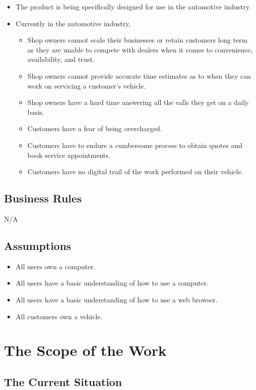 \documentclass[12pt]{article}
\begin{document}
\begin{itemize}
    \item The product is being specifically designed for use in the automotive industry.
    \item Currently in the automotive industry, 
    \begin{itemize}
        \item Shop owners cannot scale their businesses or retain customers long term as they are unable to compete with dealers when it comes to convenience, availability, and trust.
        \item Shop owners cannot provide accurate time estimates as to when they can work on servicing a customer's vehicle.
        \item Shop owners have a hard time answering all the calls they get on a daily basis.
        \item Customers have a fear of being overcharged.
        \item Customers have to endure a cumbersome process to obtain quotes and book service appointments.
        \item Customers have no digital trail of the work performed on their vehicle.
    \end{itemize}
\end{itemize}

\subsection{Business Rules}
N/A

\subsection{Assumptions}
\begin{itemize}
    \item All users own a computer.
    \item All users have a basic understanding of how to use a computer.
    \item All users have a basic understanding of how to use a web browser.
    \item All customers own a vehicle.
\end{itemize}

\section{The Scope of the Work}

\subsection{The Current Situation}
\end{document}

